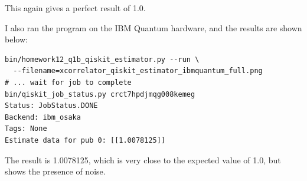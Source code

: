 \documentclass[12pt]{extarticle}
\begin{document}
\begin{enumerate}[(a)]
This again gives a perfect result of 1.0.

I also ran the program on the IBM Quantum hardware, and the results are shown below:
\begin{verbatim}
bin/homework12_q1b_qiskit_estimator.py --run \
  --filename=xcorrelator_qiskit_estimator_ibmquantum_full.png
# ... wait for job to complete
bin/qiskit_job_status.py crct7hpdjmqg008kemeg
Status: JobStatus.DONE
Backend: ibm_osaka
Tags: None
Estimate data for pub 0: [[1.0078125]]
\end{verbatim}

The result is 1.0078125, which is very close to the expected value of 1.0, but shows the presence of noise.

\end{enumerate}

\end{document}
